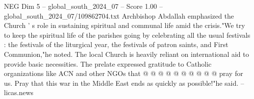 \begin{textsample}{NEG Dim 5 – global\_south\_2024\_07 – Score 1.00 – global\_south\_2024\_07/109862704.txt}
Archbishop Abdallah emphasized the Church ' s role in sustaining spiritual and communal life amid the crisis."We try to keep the spiritual life of the parishes going by celebrating all the usual festivals : the festivals of the liturgical year, the festivals of patron saints, and First Communion,"he noted.
The local Church is heavily reliant on international aid to provide basic necessities.
The prelate expressed gratitude to Catholic organizations like ACN and other NGOs that @ @ @ @ @ @ @ @ @ @ pray for us.
Pray that this war in the Middle East ends as quickly as possible!"he said. -- licas.news

\end{textsample}
